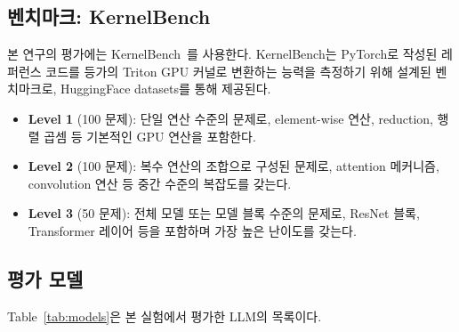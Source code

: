\documentclass[sigplan,screen,review,anonymous]{acmart}
\begin{document}
\subsection{벤치마크: KernelBench}

본 연구의 평가에는 KernelBench~\cite{ouyang2024kernelbench}를 사용한다. KernelBench는 PyTorch로 작성된 레퍼런스 코드를 등가의 Triton GPU 커널로 변환하는 능력을 측정하기 위해 설계된 벤치마크로, HuggingFace datasets를 통해 제공된다.

\begin{itemize}
    \item \textbf{Level 1} (100 문제): 단일 연산 수준의 문제로, element-wise 연산, reduction, 행렬 곱셈 등 기본적인 GPU 연산을 포함한다.
    \item \textbf{Level 2} (100 문제): 복수 연산의 조합으로 구성된 문제로, attention 메커니즘, convolution 연산 등 중간 수준의 복잡도를 갖는다.
    \item \textbf{Level 3} (50 문제): 전체 모델 또는 모델 블록 수준의 문제로, ResNet 블록, Transformer 레이어 등을 포함하며 가장 높은 난이도를 갖는다.
\end{itemize}

\subsection{평가 모델}

Table~\ref{tab:models}은 본 실험에서 평가한 LLM의 목록이다.

\begin{table}[t]
\centering
\caption{실험에 사용된 LLM 모델.}
\label{tab:models}
\end{table}
\end{document}
